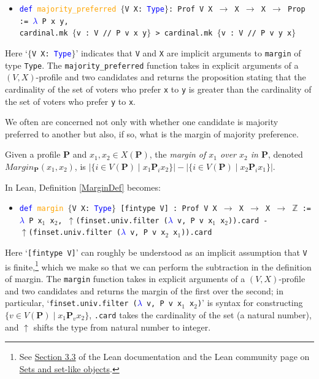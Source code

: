 \documentclass[runningheads]{llncs}
\begin{document}
\begin{itemize}
\item[] \texttt{\textcolor{blue}{def} \textcolor{orange}{majority\_preferred}  $\{$V X: \textcolor{blue}{Type}$\}$: Prof V X $\to$ X $\to$ X $\to$ Prop}\\ \texttt{:= \textcolor{blue}{$\lambda$} P x y,}\\
\texttt{cardinal.mk $\{$v : V // P v x y$\}$ >
cardinal.mk $\{$v : V // P v y x$\}$}
\end{itemize}
Here `\texttt{$\{$V X: \textcolor{blue}{Type}$\}$}' indicates that \texttt{V} and \texttt{X} are implicit arguments to \texttt{margin} of type \texttt{Type}. The \texttt{majority\_preferred} function takes in explicit arguments of a $(V,X)$-profile and two candidates  and returns the proposition stating that the cardinality of the set of voters who prefer \texttt{x} to \texttt{y} is greater than the cardinality of the set of voters who prefer \texttt{y} to \texttt{x}.

We often are concerned not only with whether one candidate is majority preferred to another but also, if so, what is the margin of majority preference.

\begin{definition}\label{MarginDef} \textnormal{Given a profile $\mathbf{P}$ and $x_1,x_2\in X(\mathbf{P})$, the \textit{margin of $x_1$ over $x_2$ in $\mathbf{P}$}, denoted $Margin_\mathbf{P}(x_1,x_2)$, is $|\{i\in V(\mathbf{P})\mid x_1\mathbf{P}_ix_2\}|-|\{i\in V(\mathbf{P})\mid x_2\mathbf{P}_ix_1\}|$.}
\end{definition}
\noindent In Lean, Definition \ref{MarginDef} becomes:

\begin{itemize}
\item[] \texttt{\textcolor{blue}{def} \textcolor{orange}{margin} $\{$V X: \textcolor{blue}{Type}$\}$  [fintype V] : Prof V X $\to$ X $\to$ X $\to$ $\mathbb{Z}$ := } \texttt{
    \textcolor{blue}{$\lambda$} P x$_1$ x$_2$, $\uparrow$(finset.univ.filter (\textcolor{blue}{$\lambda$} v, P v x$_1$ x$_2$)).card
        -} \\ \texttt{$\uparrow$(finset.univ.filter (\textcolor{blue}{$\lambda$} v, P v x$_2$ x$_1$)).card}
\end{itemize}
Here `\texttt{[fintype V]}' can roughly be understood as an implicit assumption that \texttt{V} is finite,\footnote{See \href{https://leanprover.github.io/reference/expressions.html\#implicit-arguments}{Section 3.3} of the Lean documentation and the Lean community page on \href{https://leanprover-community.github.io/theories/sets.html\#finite-types}{Sets and set-like objects}.} which we make so that we can perform the subtraction in the definition of margin. The \texttt{margin} function takes in explicit arguments of a $(V,X)$-profile and two candidates  and returns the margin of the first over the second; in particular, `\texttt{finset.univ.filter (\textcolor{blue}{$\lambda$} v, P v x$_1$ x$_2$)}' is syntax for constructing $\{v\in V(\mathbf{P})\mid x_1\mathbf{P}_v x_2\}$, \texttt{.card} takes the cardinality of the set (a natural number), and $\uparrow$ shifts the type from natural number to integer. 
\end{document}
